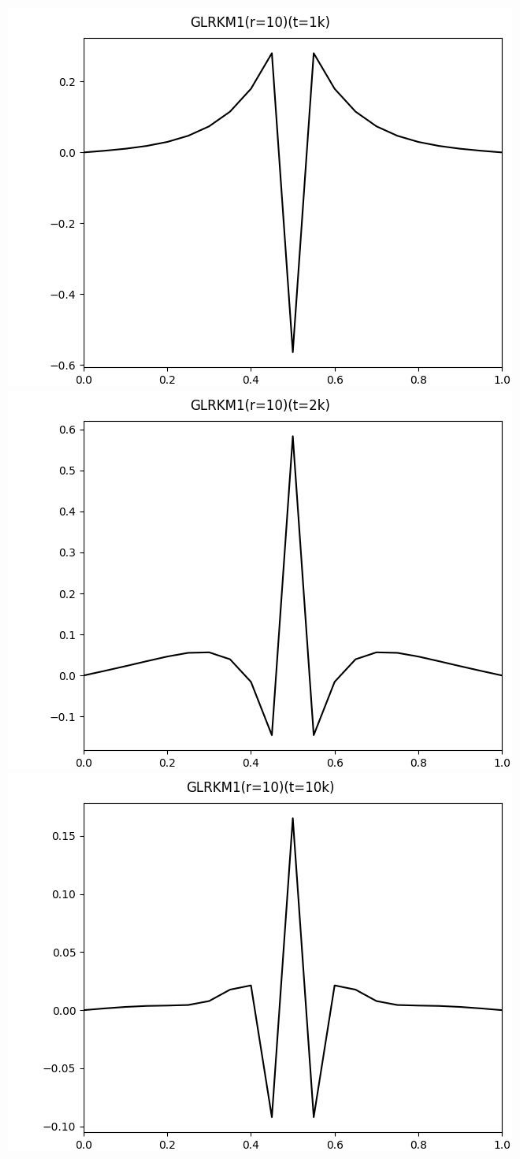 \documentclass[12pt]{ctexart}
\begin{document}
\includegraphics[scale=0.35]{GLRKM1(r=10)(t=1k).jpg}
\includegraphics[scale=0.35]{GLRKM1(r=10)(t=2k).jpg}
\includegraphics[scale=0.35]{GLRKM1(r=10)(t=10k).jpg}
\end{document}
